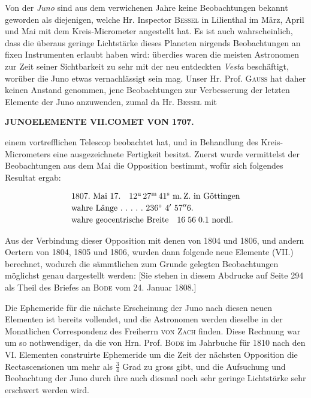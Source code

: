 \par\indent Von der \emph{Juno} sind aus dem verwichenen Jahre keine Beobachtungen bekannt geworden als diejenigen, welche Hr. Inspector \textsc{Bessel} in Lilienthal im März, April und Mai mit dem Kreis-Micrometer
angestellt hat. Es ist auch wahrscheinlich, dass die überaus geringe Lichtstärke dieses Planeten nirgends Beobachtungen an fixen Instrumenten erlaubt haben wird: überdies waren die meisten Astronomen zur Zeit seiner Sichtbarkeit zu sehr mit der neu entdeckten \emph{Vesta} beschäftigt, worüber die Juno
etwas vernachlässigt sein mag. Unser Hr. Prof. \textsc{Gauss} hat daher keinen Anstand genommen, jene Beobachtungen zur Verbesserung der letzten Elemente der Juno anzuwenden, zumal da Hr. \textsc{Bessel} mit
\par\clearpage
\thispagestyle{empty}
\noindent{}%
\makebox[12mm][l]{}%
\parbox[t]{\dimexpr\linewidth-24mm\relax}{\centering\footnotesize\bfseries JUNO\quad ELEMENTE VII.\quad COMET VON 1707.\par}%
\par\nobreak\medskip
\begingroup\fontsize{10.5}{12.3}\selectfont
\noindent einem vortrefflichen Telescop beobachtet hat, und in Behandlung des Kreis-Micrometers eine
ausgezeichnete Fertigkeit besitzt. Zuerst wurde vermittelst der Beobachtungen aus dem Mai die
Opposition bestimmt, wofür sich folgendes Resultat ergab:

\[
\begin{array}{l}
1807.\ \text{Mai}\ 17.\quad 12^{\text{u}}\,27^{\text{m}}\,41^{\text{s}}\ \text{m.\,Z. in Göttingen}\\[2pt]
\text{wahre Länge}\ .\ .\ .\ .\ .\ 236^\circ\ 4'\ 57''6.\\[2pt]
\text{wahre geocentrische Breite}\quad 16\;56\;0.1\ \text{nordl.}
\end{array}
\]\par\indent Aus der Verbindung dieser Opposition mit denen von 1804 und 1806, und andern Oertern von 1804,
1805 und 1806, wurden dann folgende neue Elemente (VII.) berechnet, wodurch die sämmtlichen
zum Grunde gelegten Beobachtungen möglichst genau dargestellt werden: [Sie stehen in diesem
Abdrucke auf Seite 294 als Theil des Briefes an \textsc{Bode} vom 24. Januar 1808.]\par\indent Die Ephemeride für die nächste Erscheinung der Juno nach diesen neuen Elementen ist bereits
vollendet, und die Astronomen werden dieselbe in der Monatlichen Correspondenz des Freiherrn
\textsc{von Zach} finden. Diese Rechnung war um so nothwendiger, da die von Hrn. Prof. \textsc{Bode} im Jahrbuche
für 1810 nach den VI. Elementen construirte Ephemeride um die Zeit der nächsten Opposition die
Rectascensionen um mehr als $\frac{3}{4}$ Grad zu gross gibt, und die Aufsuchung und
Beobachtung der Juno durch ihre auch diesmal noch sehr geringe Lichtstärke sehr erschwert
werden wird.
